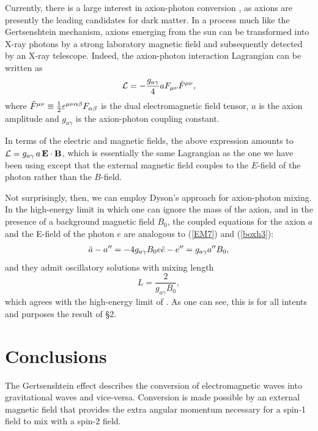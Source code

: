 \documentclass[12pt]{article}
\let\a=\alpha \let\b=\beta  \let\g=\gamma  \let\d=\delta \let\e=\varepsilon
\let\m=\mu    \let\n=\nu    \let\x=\xi     \let\p=\pi    \let\r=\rho
\def\\{\hfill\break} \let\==\equiv
\def\be{\begin{equation}}
\def\ee{\end{equation}}
\begin{document}
Currently, there is a large interest in axion-photon conversion \cite{Anast17, Adair22, Matthews22}, as axions are presently the leading candidates for dark matter. In a process much like the Gertsenshtein mechanism, axions emerging from the sun can be transformed into X-ray photons by a strong laboratory magnetic field and subsequently detected by an X-ray telescope. Indeed, the axion-photon interaction Lagrangian can be written as
\be
{\cal L} = -\frac{g_{a\g}}{4} a F_{\m\n}\Tilde{F}^{\m\n},
\ee
where $\Tilde{F}^{\m\n} \equiv \frac12 \e^{\m\n\a\b}F_{\a\b}$ is the dual electromagnetic field tensor, $a$ is the axion amplitude and $g_{a\g}$ is the axion-photon coupling constant. 

In terms of the electric and magnetic fields, the above expression amounts to ${\cal L}= g_{a\g}\, a \, {\bf E \cdot B}$, which is essentially the same Lagrangian as the one we have been using except that the external magnetic field couples to the $E$-field of the photon rather than the $B$-field.

Not surprisingly, then, we can  employ Dyson's approach for axion-photon mixing. In the high-energy limit in which one can ignore the mass of the axion, and in the presence of a background magnetic field $B_0$, the coupled equations for the axion $a$ and the E-field of the photon $e$ are analogous to (\ref{EM7}) and (\ref{boxh3}):
\begin{equation}
    \begin{split}
        \ddot{a} - a'' = - 4 g_{a \g} B_0 e \\
        \ddot{e} - e'' = g_{a \g} a'' B_0,
    \end{split}
\end{equation}
and they admit oscillatory solutions with mixing length
\begin{equation}
    L = \frac{2}{g_{a \g} B_0},
\end{equation}
which agrees with the high-energy limit of \cite{Anast17}.  As one can see, this is for all intents and purposes the result of \S 2.


\section{Conclusions}
The Gertsenshtein effect describes the conversion of electromagnetic waves into gravitational waves and vice-versa.  Conversion is made possible by an external magnetic field that provides the extra angular momentum necessary for a spin-1 field to mix with a spin-2 field.
\end{document}
